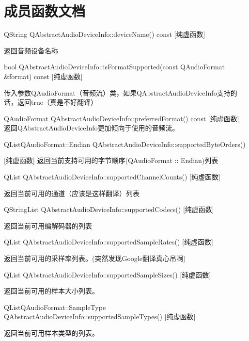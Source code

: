 \section{成员函数文档}

QString QAbstractAudioDeviceInfo::deviceName() const [纯虚函数] 

返回音频设备名称

bool QAbstractAudioDeviceInfo::isFormatSupported(const QAudioFormat \&format) const [纯虚函数] 

传入参数QAudioFormat（音频流）类，如果QAbstractAudioDeviceInfo支持的话，返回true（真是不好翻译）

QAudioFormat QAbstractAudioDeviceInfo::preferredFormat() const [纯虚函数]
 返回QAbstractAudioDeviceInfo更加倾向于使用的音频流。

QListQAudioFormat::Endian QAbstractAudioDeviceInfo::supportedByteOrders() 

[纯虚函数] 返回当前支持可用的字节顺序(QAudioFormat :: Endian)列表

QList QAbstractAudioDeviceInfo::supportedChannelCounts() [纯虚函数] 

返回当前可用的通道（应该是这样翻译）列表

QStringList QAbstractAudioDeviceInfo::supportedCodecs() [纯虚函数] 

返回当前可用编解码器的列表

QList QAbstractAudioDeviceInfo::supportedSampleRates() [纯虚函数] 

返回当前可用的采样率列表。(突然发现Google翻译真心吊啊)

QList QAbstractAudioDeviceInfo::supportedSampleSizes() [纯虚函数] 

返回当前可用的样本大小列表。

QListQAudioFormat::SampleType QAbstractAudioDeviceInfo::supportedSampleTypes() [纯虚函数] 

返回当前可用样本类型的列表。

